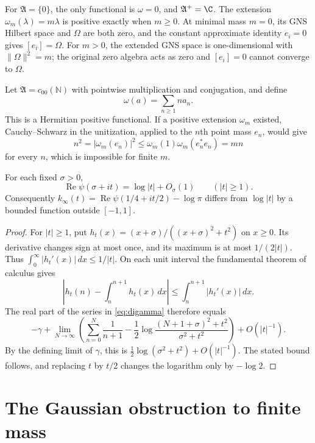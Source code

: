 For $\mathfrak A=\{0\}$, the only functional is $\omega=0$, and
$\mathfrak A^+=\C$.  The extension $\omega_m(\lambda)=m\lambda$
is positive exactly when $m\geq0$.
At minimal mass $m=0$, its GNS Hilbert space and $\Omega$ are both zero,
and the constant approximate identity $e_i=0$ gives $[e_i]=\Omega$.
For $m>0$, the extended GNS space is one-dimensional with
$\|\Omega\|^2=m$; the original zero algebra acts as zero and
$[e_i]=0$ cannot converge to $\Omega$.

\begin{example}
Let $\mathfrak A=c_{00}(\mathbb N)$ with pointwise multiplication and
conjugation, and define
\[
 \omega(a)=\sum_{n\geq1}n a_n.
\]
This is a Hermitian positive functional.  If a positive extension
$\omega_m$ existed, Cauchy--Schwarz in the unitization, applied to the
$n$th point mass $e_n$, would give
\[
 n^2=|\omega_m(e_n)|^2
 \leq\omega_m(1)\omega_m(e_n^*e_n)=mn
\]
for every $n$, which is impossible for finite $m$.
\end{example}


\begin{lemma}
\label{lem:gamma-log-size}
For each fixed $\sigma>0$,
\[
 \operatorname{Re}\psi(\sigma+it)=\log|t|+O_\sigma(1)
 \qquad(|t|\geq1).
\]
Consequently $k_\infty(t)=\operatorname{Re}\psi(1/4+it/2)-\log\pi$
differs from $\log|t|$ by a bounded function outside $[-1,1]$.
\end{lemma}

\begin{proof}
For $|t|\geq1$, put
$h_t(x)=(x+\sigma)/((x+\sigma)^2+t^2)$ on $x\geq0$.
Its derivative changes sign at most once, and its maximum is at most
$1/(2|t|)$.  Thus $\int_0^\infty|h_t'(x)|\,dx\leq1/|t|$.
On each unit interval the fundamental theorem of calculus gives
\[
 \left|h_t(n)-\int_n^{n+1}h_t(x)\,dx\right|
 \leq\int_n^{n+1}|h_t'(x)|\,dx.
\]
The real part of the series in \eqref{eq:digamma} therefore equals
\[
 -\gamma+\lim_{N\to\infty}
 \left(\sum_{n=0}^N\frac1{n+1}
 -\frac12\log\frac{(N+1+\sigma)^2+t^2}{\sigma^2+t^2}\right)
 +O(|t|^{-1}).
\]
By the defining limit of $\gamma$, this is
$\tfrac12\log(\sigma^2+t^2)+O(|t|^{-1})$.
The stated bound follows, and replacing $t$ by $t/2$ changes the logarithm
only by $-\log2$.
\end{proof}

\section{The Gaussian obstruction to finite mass}
\label{sec:weil-mass}

